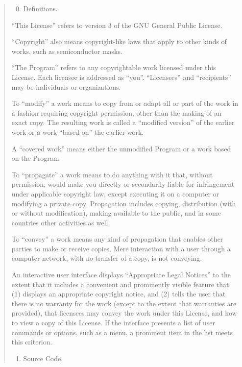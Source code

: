 \documentclass[letterpaper,10pt,english]{sphinxmanual}
\begin{document}
\begin{quote}
\begin{enumerate}
\setcounter{enumi}{-1}
\item {} 
Definitions.

\end{enumerate}

``This License'' refers to version 3 of the GNU General Public License.

``Copyright'' also means copyright-like laws that apply to other kinds of
works, such as semiconductor masks.

``The Program'' refers to any copyrightable work licensed under this
License.  Each licensee is addressed as ``you''.  ``Licensees'' and
``recipients'' may be individuals or organizations.

To ``modify'' a work means to copy from or adapt all or part of the work
in a fashion requiring copyright permission, other than the making of an
exact copy.  The resulting work is called a ``modified version'' of the
earlier work or a work ``based on'' the earlier work.

A ``covered work'' means either the unmodified Program or a work based
on the Program.

To ``propagate'' a work means to do anything with it that, without
permission, would make you directly or secondarily liable for
infringement under applicable copyright law, except executing it on a
computer or modifying a private copy.  Propagation includes copying,
distribution (with or without modification), making available to the
public, and in some countries other activities as well.

To ``convey'' a work means any kind of propagation that enables other
parties to make or receive copies.  Mere interaction with a user through
a computer network, with no transfer of a copy, is not conveying.

An interactive user interface displays ``Appropriate Legal Notices''
to the extent that it includes a convenient and prominently visible
feature that (1) displays an appropriate copyright notice, and (2)
tells the user that there is no warranty for the work (except to the
extent that warranties are provided), that licensees may convey the
work under this License, and how to view a copy of this License.  If
the interface presents a list of user commands or options, such as a
menu, a prominent item in the list meets this criterion.
\begin{enumerate}
\item {} 
Source Code.


\end{enumerate}
\end{quote}
\end{document}
